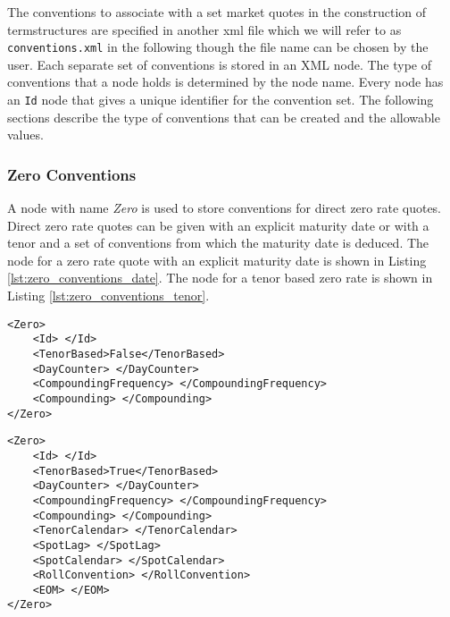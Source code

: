 The conventions to associate with a set market quotes in the construction of termstructures are specified in another xml file which we will refer to as 
{\tt conventions.xml} in the following though the file name can be chosen by the user. 
Each separate set of conventions is stored in an XML node. The type of conventions 
that a node holds is determined by the node name. Every node has an \lstinline!Id! node that gives a unique identifier for 
the convention set. The following sections describe the type of conventions that can be created and the allowable values.

\subsubsection{Zero Conventions}
A node with name \emph{Zero} is used to store conventions for direct zero rate quotes. Direct zero rate quotes can be 
given with an explicit maturity date or with a tenor and a set of conventions from which the maturity date is deduced. The 
node for a zero rate quote with an explicit maturity date is shown in Listing \ref{lst:zero_conventions_date}. The node 
for a tenor based zero rate is shown in Listing \ref{lst:zero_conventions_tenor}.

\begin{lstlisting}[caption={Zero conventions, explicit maturity date}, label=lst:zero_conventions_date]
<Zero>
	<Id> </Id>
	<TenorBased>False</TenorBased>
	<DayCounter> </DayCounter>
	<CompoundingFrequency> </CompoundingFrequency>
	<Compounding> </Compounding>
</Zero>
\end{lstlisting}

\begin{lstlisting}[caption={Zero conventions, tenor based}, label=lst:zero_conventions_tenor]
<Zero>
	<Id> </Id>
	<TenorBased>True</TenorBased>
	<DayCounter> </DayCounter>
	<CompoundingFrequency> </CompoundingFrequency>
	<Compounding> </Compounding>
	<TenorCalendar> </TenorCalendar>
	<SpotLag> </SpotLag>
	<SpotCalendar> </SpotCalendar>
	<RollConvention> </RollConvention>
	<EOM> </EOM>
</Zero>
\end{lstlisting}

